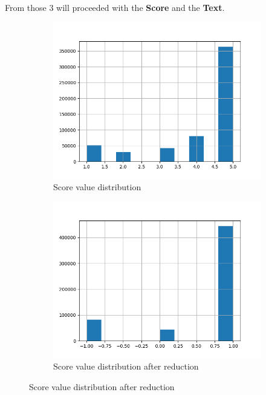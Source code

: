 \documentclass{article}
\begin{document}
From those 3 will proceeded with the \textbf{Score} and the \textbf{Text}.

\begin{figure}
  \begin{subfigure}[b]{0.4\linewidth}
  \includegraphics[width=\linewidth]{Score5.png}
  \caption{Score value distribution}
  \label{fig:Score5}
\end{subfigure}

\begin{subfigure}[b]{0.4\linewidth}
  \includegraphics[width=\linewidth]{Score3.png}
  \caption{Score value distribution after reduction}
  \label{fig:Score3}
\end{subfigure}
\end{figure}
\end{document}
